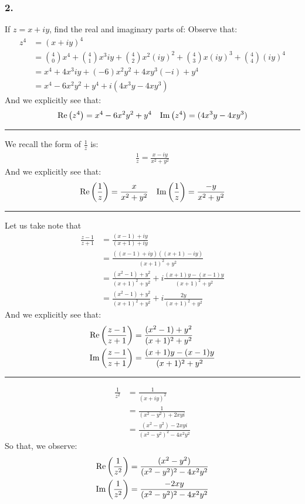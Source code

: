 \subsubsection{2.}
If $ z = x + iy $, find the real and imaginary parts of:
Observe that:
\begin{align*}
	z^4 &= (x + iy)^4 \\
	 &= \binom{4}{0}x^4 + \binom{4}{1}x^3iy + \binom{4}{2} x^2(iy)^2 + \binom{4}{3}x(iy)^3 + \binom{4}{4} (iy)^4 \\
	 &= x^4 + 4 x^3iy + (-6) x^2 y^2 + 4 xy^3(-i) + y^4 \\
	 &= x^4 -6x^2y^2 + y^4 + i(4x^3y - 4xy^3)
\end{align*}
And we explicitly see that:
\begin{align*}
\mathrm{Re} \left( z^4 \right) = x^4 -6x^2y^2 + y^4 \quad \mathrm{Im} \left( z^4 \right) = (4x^3y - 4xy^3)
\end{align*}
\rule{\textwidth}{1pt}
We recall the form of $ \frac{1}{z} $ is:
\begin{align*}
\frac{1}{z} = \frac{ x - i y}{x^2 + y^2}
\end{align*}
And we explicitly see that:
\begin{align*}
\mathrm{Re} \left(  \frac{1}{z}  \right) = \frac{ x }{x^2 + y^2} \quad \mathrm{Im} \left( \frac{1}{z} \right) = \frac{  - y}{x^2 + y^2}
\end{align*}
\rule{\textwidth}{1pt}
Let us take note that
\begin{align*}
\frac{z-1}{z+1} &= \frac{(x -1) + iy}{(x + 1) + iy} \\
&= \frac{((x-1)+iy)((x+1)-iy)}{(x+1)^2 + y^2} \\
&= \frac{(x^2 - 1) + y^2}{(x+1)^2 + y^2} + i\frac{(x+1)y - (x-1)y}{(x+1)^2 + y^2} \\
&= \frac{(x^2 - 1) + y^2}{(x+1)^2 + y^2} + i\frac{2y}{(x+1)^2 + y^2}
\end{align*}
And we explicitly see that:
\begin{align*}
\mathrm{Re} \left(  \frac{z-1}{z+1}  \right) &= \frac{(x^2 - 1) + y^2}{(x+1)^2 + y^2} \\ 
\mathrm{Im} \left(  \frac{z-1}{z+1}  \right) &= \frac{(x+1)y - (x-1)y}{(x+1)^2 + y^2}
\end{align*}
\rule{\textwidth}{1pt}
\begin{align*}
\frac{1}{z^2} &= \frac{1}{(x + iy)^2} \\
 &= \frac{1}{(x^2 - y^2) + 2xyi} \\
 &= \frac{(x^2 - y^2 ) -2xyi}{(x^2 - y^2)^2 - 4x^2y^2}
\end{align*}
So that, we observe:
\begin{align*}
\mathrm{Re} \left(  \frac{1}{z^2}  \right) &= \frac{(x^2 - y^2 )}{(x^2 - y^2)^2 - 4x^2y^2} \\ 
\mathrm{Im} \left(  \frac{1}{z^2}  \right) &= \frac{-2xy}{(x^2 - y^2)^2 - 4x^2y^2}
\end{align*}
